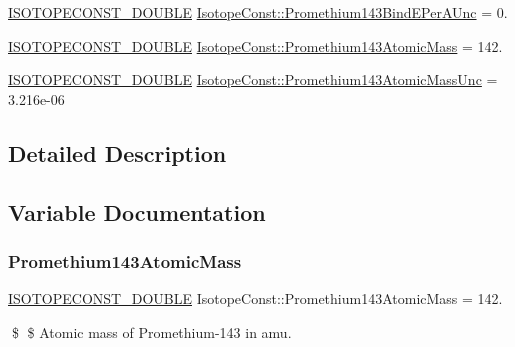 \begin{DoxyCompactItemize}
\item 
\mbox{\hyperlink{group___isotope_const-_macros_ga8f45a7272ce02c0b4c65c44636ed719a}{I\+S\+O\+T\+O\+P\+E\+C\+O\+N\+S\+T\+\_\+\+D\+O\+U\+B\+LE}} \mbox{\hyperlink{group___isotope_const-_promethium-_pm143_ga840f7a6e6c6236fd2e8c80d339e31643}{Isotope\+Const\+::\+Promethium143\+Bind\+E\+Per\+A\+Unc}} = 0.
\item 
\mbox{\hyperlink{group___isotope_const-_macros_ga8f45a7272ce02c0b4c65c44636ed719a}{I\+S\+O\+T\+O\+P\+E\+C\+O\+N\+S\+T\+\_\+\+D\+O\+U\+B\+LE}} \mbox{\hyperlink{group___isotope_const-_promethium-_pm143_ga65215cc26b700ab7fff39c6e509e75ad}{Isotope\+Const\+::\+Promethium143\+Atomic\+Mass}} = 142.
\item 
\mbox{\hyperlink{group___isotope_const-_macros_ga8f45a7272ce02c0b4c65c44636ed719a}{I\+S\+O\+T\+O\+P\+E\+C\+O\+N\+S\+T\+\_\+\+D\+O\+U\+B\+LE}} \mbox{\hyperlink{group___isotope_const-_promethium-_pm143_ga11f46117821b74ba3225f1ff1cfe452f}{Isotope\+Const\+::\+Promethium143\+Atomic\+Mass\+Unc}} = 3.\+216e-\/06
\end{DoxyCompactItemize}


\subsection{Detailed Description}


\subsection{Variable Documentation}
\mbox{\label{group___isotope_const-_promethium-_pm143_ga65215cc26b700ab7fff39c6e509e75ad}} 
\subsubsection{\texorpdfstring{Promethium143\+Atomic\+Mass}{Promethium143AtomicMass}}
{\footnotesize\ttfamily \mbox{\hyperlink{group___isotope_const-_macros_ga8f45a7272ce02c0b4c65c44636ed719a}{I\+S\+O\+T\+O\+P\+E\+C\+O\+N\+S\+T\+\_\+\+D\+O\+U\+B\+LE}} Isotope\+Const\+::\+Promethium143\+Atomic\+Mass = 142.}

\$ \$ Atomic mass of Promethium-\/143 in amu. \mbox{\label{group___isotope_const-_promethium-_pm143_ga11f46117821b74ba3225f1ff1cfe452f}} 
